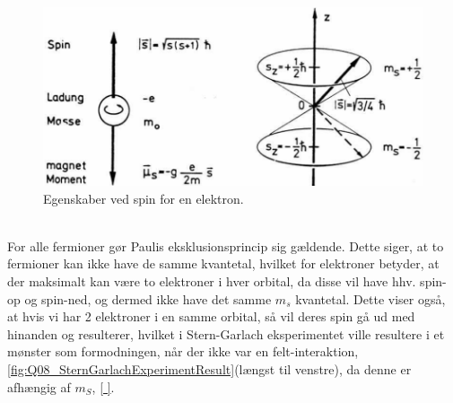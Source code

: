 \begin{figure}[!h]
    \centering
    \includegraphics[width=\textwidth]{Q08/images/ProportiesOfSpin.PNG}
    \caption{Egenskaber ved spin for en elektron.}
    \label{fig:Q08_PropertiesOfSpin}
\end{figure}
$ $\\

For alle fermioner gør Paulis eksklusionsprincip sig gældende. Dette siger, at to fermioner kan ikke have de samme kvantetal, hvilket for elektroner betyder, at der maksimalt kan være to elektroner i hver orbital, da disse vil have hhv. spin-op og spin-ned, og dermed ikke have det samme $m_s$ kvantetal. Dette viser også, at hvis vi har 2 elektroner i en samme orbital, så vil deres spin gå ud med hinanden og resulterer, hvilket i Stern-Garlach eksperimentet ville resultere i et mønster som formodningen, når der ikke var en felt-interaktion, \cref{fig:Q08_SternGarlachExperimentResult}(længst til venstre), da denne er afhængig af $m_S$, \cref{ }.
